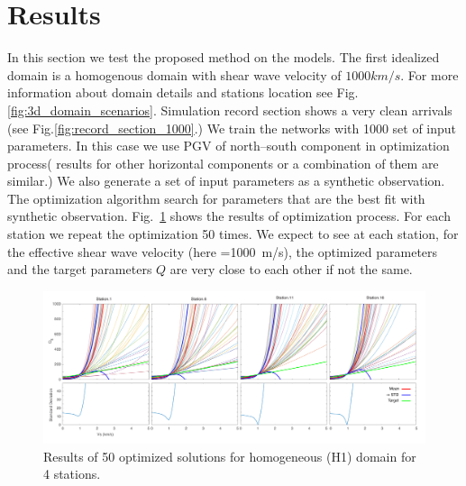 \section{Results}
In this section we test the proposed method on the models. The first idealized domain is a homogenous domain with shear wave velocity of $1000 km/s$. For more information about domain details and stations location see Fig.\ref{fig:3d_domain_scenarios}. Simulation record section shows a very clean arrivals (see Fig.\ref{fig:record_section_1000}.) We train the networks with 1000 set of input parameters. In this case we use PGV of north--south component in optimization process( results for other horizontal components or a combination of them are similar.)  We also generate a set of input parameters as a synthetic observation. The optimization algorithm search for parameters that are the best fit with synthetic observation.  Fig.~\ref{fig:station_1_1000_H1} shows the results of optimization process. For each station we repeat the optimization 50 times. We expect to see at each station, for the effective shear wave velocity (here \vs{}=1000~m/s), the optimized parameters and the target parameters $Q$ are very close to each other if not the same. 

  \begin{figure}[ht]
    \centering
    \includegraphics[width=\textwidth]{figures/pdf/Figure_14-H1-pgv.pdf}
    \caption{Results of 50 optimized solutions for homogeneous (H1) domain for 4 stations.}
    \label{fig:station_1_1000_H1}
\end{figure}

